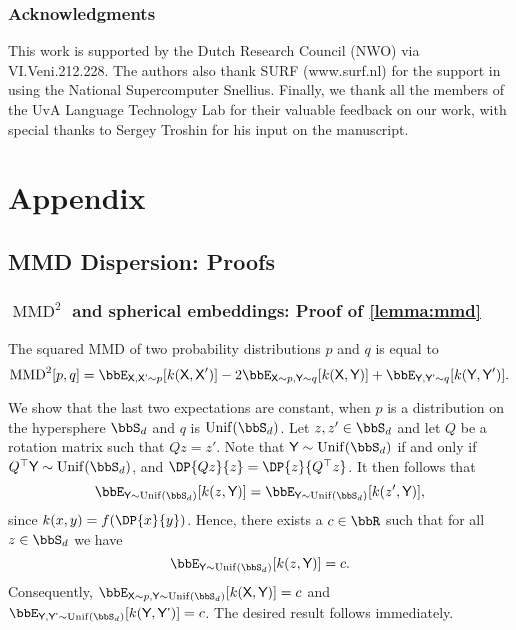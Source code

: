 \documentclass[10pt]{article} %
\newcommand\var[1]{\textsf{#1}}
\begin{document}
\subsubsection*{Acknowledgments}
This work is supported by the Dutch Research Council (NWO) via VI.Veni.212.228. The authors also thank SURF (www.surf.nl) for the support in using the National Supercomputer Snellius. Finally, we thank all the members of the UvA Language Technology Lab for their valuable feedback on our work, with special thanks to Sergey Troshin for his input on the manuscript.




\appendix
\section{Appendix}
\subsection{MMD Dispersion: Proofs}\label{app:mmd-proofs}
\subsubsection{\(\operatorname{MMD}^2\) and spherical embeddings: Proof of \cref{lemma:mmd}}
The squared MMD of two probability distributions \(p\) and \(q\) is equal to~\citep[Lemma 6]{JMLR:v13:gretton12a}
\[
\operatorname{MMD}^2[p, q] = \bbE_{\var{X}, \var{X'} \sim p}[k(\var X, \var X')] - 2\bbE_{\var{X} \sim p, \var{Y} \sim q} [k(\var X, \var Y)] + \bbE_{\var{Y}, \var{Y'} \sim q}[k(\var Y, \var Y')].
\]

We show that the last two expectations are constant, when \(p\) is a distribution on the hypersphere \(\bbS_d\) and \(q\) is \(\operatorname{Unif}(\bbS_d)\).
Let \(z, z' \in \bbS_d\) and let \(Q\) be a rotation matrix such that \(Qz = z'\). 
Note that \(\var{Y} \sim \operatorname{Unif}(\bbS_d)\) if and only if \(Q^\top \var{Y} \sim \operatorname{Unif}(\bbS_d)\), and \(\DP{Qz}{z} = \DP{z}{Q^\top z}\). 
It then follows that 
\[
\bbE_{\var{Y} \sim \operatorname{Unif}(\bbS_d)}[k(z, \var{Y})] = \bbE_{\var{Y} \sim \operatorname{Unif}(\bbS_d)}[k(z', \var{Y})],
\]
since \(k(x,y) = f(\DP{x}{y})\).
Hence, there exists a \(c \in \bbR\) such that for all \(z \in \bbS_d\) we have 
\[
\bbE_{\var{Y} \sim \operatorname{Unif}(\bbS_d)}[k(z, \var{Y})] = c.
\]
Consequently, \(\bbE_{\var{X} \sim p, \var{Y} \sim \operatorname{Unif}(\bbS_d)} [k(\var{X}, \var{Y})] = c\) and \(\bbE_{\var{Y}, \var{Y'} \sim \operatorname{Unif}(\bbS_d)}[k(\var{Y}, \var{Y'})] = c\). 
The desired result follows immediately.
\end{document}

